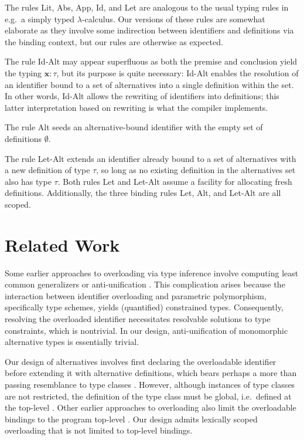\documentclass{article}
\renewcommand{\=}{\triangleq}
\begin{document}
The rules {\sc Lit}, {\sc Abs}, {\sc App}, {\sc Id}, and {\sc Let}
are analogous to the usual typing rules in
e.g.~a simply typed $\lambda$-calculus.
Our versions of these rules are somewhat elaborate as they involve some
indirection between identifiers and definitions via the binding context,
but our rules are otherwise as expected.

The rule {\sc Id-Alt} may appear superfluous as both the premise and
conclusion yield the typing $\textbf{x} : \tau$,
but its purpose is quite necessary:
{\sc Id-Alt} enables the resolution of an identifier bound to a set of
alternatives into a single definition within the set.
In other words,
{\sc Id-Alt} allows the rewriting of identifiers into definitions;
this latter interpretation based on rewriting is what the compiler
implements.

The rule {\sc Alt} seeds an alternative-bound identifier with the
empty set of definitions $\emptyset$.

The rule {\sc Let-Alt} extends an identifier already bound to a set of
alternatives with a new definition of type $\tau$,
so long as no existing definition in the alternatives set also has type $\tau$.
Both rules {\sc Let} and {\sc Let-Alt} assume a facility for allocating fresh
definitions.
Additionally, the three binding rules {\sc Let}, {\sc Alt}, and {\sc Let-Alt}
are all scoped.

\section{Related Work}

Some earlier approaches to overloading via type inference involve computing
least common generalizers or anti-unification
\cite{smith94,camarao99}.
This complication arises because the interaction between identifier overloading
and parametric polymorphism, specifically type schemes,
yields (quantified) constrained types.
Consequently, resolving the overloaded identifier necessitates resolvable
solutions to type constraints, which is nontrivial.
In our design,
anti-unification of monomorphic alternative types is essentially trivial.

Our design of alternatives involves first declaring the overloadable
identifier before extending it with alternative definitions,
which bears perhaps a more than passing resemblance to type classes
\cite{wadler89}.
However, although instances of type classes are not restricted,
the definition of the type class must be global,
i.e.~defined at the top-level \cite{loh06}.
Other earlier approaches to overloading also limit the overloadable bindings
to the program top-level
\cite{odersky95}.
Our design admits lexically scoped overloading that is not limited to
top-level bindings.
\end{document}
